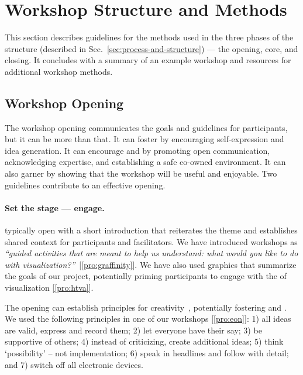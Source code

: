\section{Workshop Structure and Methods}
\label{sec:design}

This section describes guidelines for the methods used in the three phases of the \workshop structure (described in Sec.~\ref{sec:process-and-structure}) --- the opening, core, and closing. It concludes with a summary of an example workshop and resources for additional workshop methods.

\subsection{Workshop Opening}

The workshop opening communicates the goals and guidelines for participants, but it can be more than that. It can foster \agency by encouraging self-expression and idea generation. It can encourage \collegiality and \trust by promoting open communication, acknowledging expertise, and establishing a safe co-owned environment. It can also garner \interest by showing that the workshop will be useful and enjoyable. Two guidelines contribute to an effective opening.

\paragraph{Set the stage --- engage.} \workshops typically open with a short introduction that reiterates the theme and establishes shared context for participants and facilitators. We have introduced workshops as \emph{``guided activities that are meant to help us understand: what would you like to do with visualization?''}~[\ref{pro:graffinity}]. We have also used graphics that summarize the goals of our project, potentially priming participants to engage with the \topic of visualization [\ref{pro:htva}].

The opening can establish principles for creativity~\cite{CreativeEducationFoundation2015,Osborn1953}, potentially fostering \trust and \collegiality. We used the following principles in one of our workshops [\ref{pro:eon}]: 1) all ideas are valid, express and record them; 2) let everyone have their say; 3) be supportive of others; 4) instead of criticizing, create additional ideas; 5) think `possibility' -- not implementation; 6) speak in headlines and follow with detail; and 7) switch off all electronic devices.

